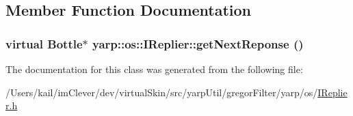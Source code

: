 \subsection{Member Function Documentation}
\hypertarget{classyarp_1_1os_1_1_i_replier_a6b14c9b19625876caa5843b15537dcbd}{
\subsubsection[{getNextReponse}]{\setlength{\rightskip}{0pt plus 5cm}virtual Bottle$\ast$ yarp::os::IReplier::getNextReponse ()}}
\label{classyarp_1_1os_1_1_i_replier_a6b14c9b19625876caa5843b15537dcbd}


The documentation for this class was generated from the following file:\begin{DoxyCompactItemize}
\item 
/Users/kail/imClever/dev/virtualSkin/src/yarpUtil/gregorFilter/yarp/os/\hyperlink{_i_replier_8h}{IReplier.h}\end{DoxyCompactItemize}
